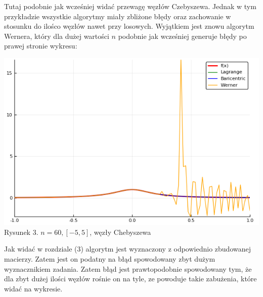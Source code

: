 \documentclass[11pt, wide]{article}
\begin{document}
Tutaj podobnie jak wcześniej widać przewagę węzłów Czebyszewa. Jednak w tym przykładzie wszystkie algorytmy
miały zbliżone błędy oraz zachowanie w stosunku do ilośco węzłów nawet przy losowych. Wyjątkiem jest znowu algorytm Wernera,
który dla dużej wartości $n$ podobnie jak wcześniej generuje błędy po prawej stronie wykresu:
\begin{center}
    \includegraphics[scale=0.4]{wykres3}\\
    Rysunek 3. $n = 60, [-5,5]$, węzły Chebyszewa
\end{center}
Jak widać w rozdziale (3) algorytm jest wyznaczony
z odpowiednio zbudowanej macierzy. Zatem jest on podatny na błąd spowodowany zbyt dużym 
wyznacznikiem zadania. Zatem błąd jest prawtopodobnie spowodowany tym, że dla zbyt dużej ilości
węzłów rośnie on na tyle, ze powoduje takie zabużenia, które widać na wykresie. 
\end{document}

